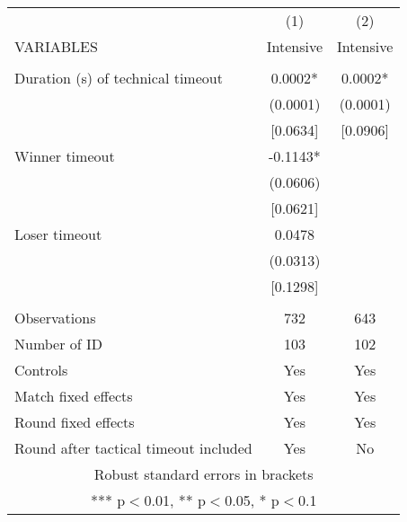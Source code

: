 \documentclass[]{article}
\begin{document}
\begin{tabular}{lcc} \hline
 & (1) & (2) \\
VARIABLES & Intensive & Intensive \\ \hline
 &  &  \\
Duration (s) of technical timeout & 0.0002* & 0.0002* \\
 & (0.0001) & (0.0001) \\
 & [0.0634] & [0.0906] \\
Winner timeout & -0.1143* &  \\
 & (0.0606) &  \\
 & [0.0621] &  \\
Loser timeout & 0.0478 &  \\
 & (0.0313) &  \\
 & [0.1298] &  \\
 &  &  \\
Observations & 732 & 643 \\
Number of ID & 103 & 102 \\
Controls & Yes & Yes \\
Match fixed effects & Yes & Yes \\
Round fixed effects & Yes & Yes \\
 Round after tactical timeout included & Yes & No \\ \hline
\multicolumn{3}{c}{ Robust standard errors in brackets} \\
\multicolumn{3}{c}{ *** p$<$0.01, ** p$<$0.05, * p$<$0.1} \\
\end{tabular}
\end{document}
